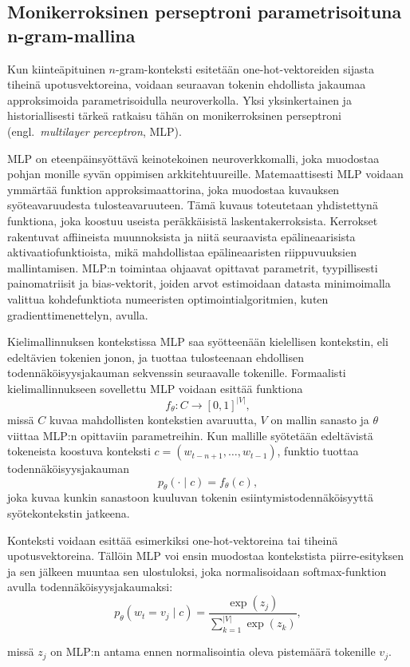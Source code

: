 \subsection{Monikerroksinen perseptroni parametrisoituna n-gram-mallina}

Kun kiinteäpituinen \(n\)-gram-konteksti esitetään one-hot-vektoreiden sijasta
tiheinä upotusvektoreina, voidaan seuraavan tokenin ehdollista jakaumaa
approksimoida parametrisoidulla neuroverkolla. Yksi yksinkertainen ja
historiallisesti tärkeä ratkaisu tähän on monikerroksinen perseptroni
(engl.\ \emph{multilayer perceptron}, MLP).

MLP on eteenpäinsyöttävä keinotekoinen neuroverkkomalli, joka muodostaa pohjan
monille syvän oppimisen arkkitehtuureille. Matemaattisesti MLP voidaan ymmärtää
funktion approksimaattorina, joka muodostaa kuvauksen syöteavaruudesta
tulosteavaruuteen. Tämä kuvaus toteutetaan yhdistettynä funktiona, joka koostuu
useista peräkkäisistä laskentakerroksista. Kerrokset rakentuvat affiineista
muunnoksista ja niitä seuraavista epälineaarisista aktivaatiofunktioista, mikä
mahdollistaa epälineaaristen riippuvuuksien mallintamisen. MLP:n toimintaa
ohjaavat opittavat parametrit, tyypillisesti painomatriisit ja bias-vektorit,
joiden arvot estimoidaan datasta minimoimalla valittua kohdefunktiota
numeeristen optimointialgoritmien, kuten gradienttimenettelyn, avulla.

Kielimallinnuksen kontekstissa MLP saa syötteenään kielellisen kontekstin, eli
edeltävien tokenien jonon, ja tuottaa tulosteenaan ehdollisen
todennäköisyysjakauman sekvenssin seuraavalle tokenille. Formaalisti
kielimallinnukseen sovellettu MLP voidaan esittää funktiona
\[
  f_\theta : C \to [0,1]^{|V|},
\]
missä \(C\) kuvaa mahdollisten kontekstien avaruutta, \(V\) on mallin sanasto
ja \(\theta\) viittaa MLP:n opittaviin parametreihin. Kun mallille syötetään
edeltävistä tokeneista koostuva konteksti
\(c=(w_{t-n+1},\ldots,w_{t-1})\), funktio tuottaa todennäköisyysjakauman
\[
  p_\theta(\cdot \mid c) = f_\theta(c),
\]
joka kuvaa kunkin sanastoon kuuluvan tokenin esiintymistodennäköisyyttä
syötekontekstin jatkeena.

Konteksti voidaan esittää esimerkiksi one-hot-vektoreina tai tiheinä
upotusvektoreina. Tällöin MLP voi ensin muodostaa kontekstista
piirre-esityksen ja sen jälkeen muuntaa sen ulostuloksi, joka normalisoidaan
softmax-funktion avulla todennäköisyysjakaumaksi:
\[
  p_\theta(w_t=v_j\mid c)
  =
  \frac{\exp(z_j)}{\sum_{k=1}^{|V|}\exp(z_k)},
\]

missä \(z_j\) on MLP:n antama ennen normalisointia oleva pistemäärä tokenille
\(v_j\).

